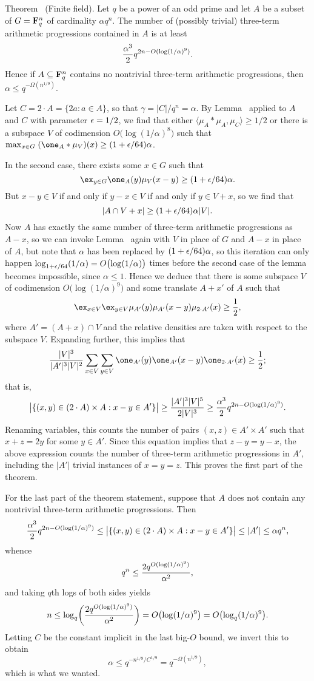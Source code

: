 \parenproclaim Theorem~{\advthm} (Finite field). Let $q$ be a power of an odd prime and let $A$ be
a subset of $G = {\bf F}_q^n$ of cardinality $\alpha q^n$. The number of (possibly trivial)
three-term arithmetic progressions contained in $A$ is at least
$${\alpha^3\over 2}q^{2n-O(\log(1/\alpha)^9)}.$$
Hence if $A\subseteq {\bf F}_q^n$ contains no nontrivial three-term arithmetic progressions, then
$\alpha \le q^{-\Omega(n^{1/9})}$.

\proof Let $C = 2\cdot A = \{2a : a\in A\}$, so that $\gamma = |C|/q^n = \alpha$. By Lemma~{\densityincrement}
applied to $A$ and $C$ with parameter $\epsilon = 1/2$, we find that either
$\langle \mu_A*\mu_A,\mu_C\rangle \ge 1/2$ or there is a subspace $V$ of codimension
$O\bigl(\log(1/\alpha)^8\bigr)$ such that $\max_{x\in G}\;(\one_A*\mu_V)(x)\ge (1+\eps/64)\alpha$.

In the second case, there exists some $x\in G$ such that
$$\ex_{y\in G} \one_A(y)\mu_V(x-y) \ge (1+\eps/64)\alpha.$$
But $x-y\in V$ if and only if $y-x\in V$ if and only if $y\in V+x$, so we find that
$$|A\cap V+x| \ge (1+\epsilon/64)\alpha|V|.$$
Now $A$ has exactly the same number of three-term arithmetic progressions as $A-x$, so we can invoke
Lemma~{\densityincrement} again with $V$ in place of $G$ and $A-x$ in place of $A$, but note that $\alpha$
has been replaced by $(1+\epsilon/64)\alpha$, so this iteration can only happen
$\log_{1+\epsilon/64}(1/\alpha) = O\bigl(\log(1/\alpha)\bigr)$ times
before the second case of the lemma becomes impossible, since $\alpha\le 1$. Hence we deduce that
there is some subspace $V$ of codimension $O\bigl(\log(1/\alpha)^9\bigr)$ and some translate $A+x'$ of $A$
such that
$$\ex_{x\in V} \ex_{y\in V} \mu_{A'}(y)\mu_{A'}(x-y)\mu_{2\cdot A'}(x) \ge {1\over 2},$$
where $A' = (A+x)\cap V$ and
the relative densities are taken with respect to the subspace $V$. Expanding further, this implies that
$${|V|^3\over |A'|^3|V|^2} \sum_{x\in V}\sum_{y\in V}
\one_{A'}(y) \one_{A'}(x-y)\one_{2\cdot A'}(x) \ge {1\over 2};$$
that is,
$$\bigl| \{ (x,y)\in (2\cdot A) \times A : x-y\in A'\}\bigr| \ge {|A'|^3|V|^5\over 2|V|^3}
\ge {\alpha^3\over 2}q^{2n-O(\log(1/\alpha)^9)}.$$
Renaming variables, this counts the number of pairs $(x,z) \in A'\times A'$ such that $x+z = 2y$ for some
$y\in A'$. Since this equation implies that $z-y = y-x$, the above expression
counts the number of three-term arithmetic
progressions in $A'$, including the $|A'|$ trivial instances of $x=y=z$. This proves the first part of the
theorem.

For the last part of the theorem statement,
suppose that $A$ does not contain any nontrivial three-term arithmetic progressions.
Then
$${\alpha^3\over 2}q^{2n-O(\log(1/\alpha)^9)} \le \bigl| \{ (x,y)\in (2\cdot A) \times A : x-y\in A'\}\bigr|
\le |A'| \le \alpha q^n,$$
whence
$$q^n \le {2q^{O(\log(1/\alpha)^9)}\over \alpha^2},$$
and taking $q$th logs of both sides yields
$$n \le \log_q\biggl({2q^{O(\log(1/\alpha)^9)}\over \alpha^2}\biggr) = O\bigl(\log(1/\alpha)^9\bigr)
= O\bigl(\log_q(1/\alpha)^9\bigr).$$
Letting $C$ be the constant implicit in the last big-$O$ bound, we invert this to obtain
$$\alpha\le q^{-n^{1/9}/C^{1/9}} = q^{-\Omega(n^{1/9})},$$
which is what we wanted.\slug

